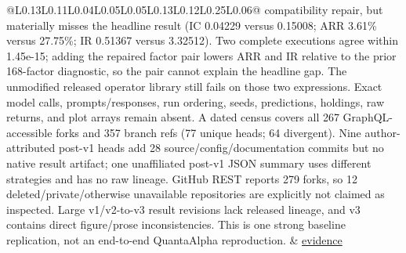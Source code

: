 \begin{longtable}{@{}L{0.13\linewidth}L{0.11\linewidth}L{0.04\linewidth}L{0.05\linewidth}L{0.05\linewidth}L{0.13\linewidth}L{0.12\linewidth}L{0.25\linewidth}L{0.06\linewidth}@{}}
compatibility repair, but materially misses the headline result (IC 0.04229 versus 0.15008; ARR 3.61\% versus 27.75\%; IR 0.51367 versus 3.32512). Two complete executions agree within 1.45e-15; adding the repaired factor pair lowers ARR and IR relative to the prior 168-factor diagnostic, so the pair cannot explain the headline gap. The unmodified released operator library still fails on those two expressions. Exact model calls, prompts/responses, run ordering, seeds, predictions, holdings, raw returns, and plot arrays remain absent. A dated census covers all 267 GraphQL-accessible forks and 357 branch refs (77 unique heads; 64 divergent). Nine author-attributed post-v1 heads add 28 source/config/documentation commits but no native result artifact; one unaffiliated post-v1 JSON summary uses different strategies and has no raw lineage. GitHub REST reports 279 forks, so 12 deleted/private/otherwise unavailable repositories are explicitly not claimed as inspected. Large v1/v2-to-v3 result revisions lack released lineage, and v3 contains direct figure/prose inconsistencies. This is one strong baseline replication, not an end-to-end QuantaAlpha reproduction. & \href{https://github.com/QuantaAlpha/QuantaAlpha}{evidence} \\

\end{longtable}
